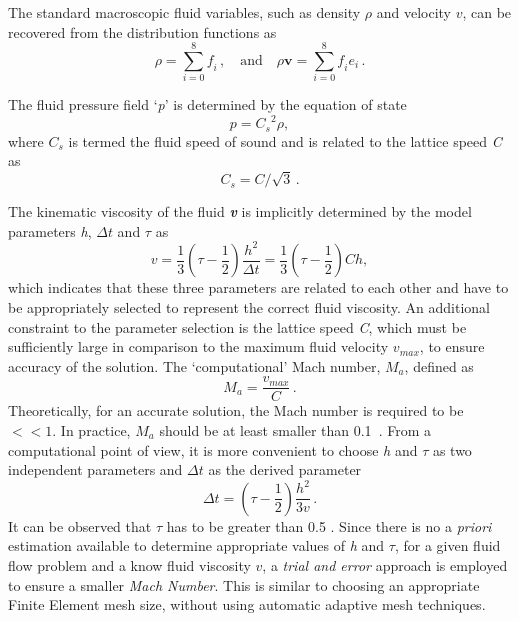 The standard macroscopic fluid variables, such as density $\rho$ and velocity 
$\mathbf{\mathit{ v}}$, can be recovered from the distribution functions as
%
\begin{equation}
	\rho = \sum\limits_{\mathit{i}=0}^{8}{\mathit{f_i}}\,, \quad \mbox{and} 
	\quad \rho \mathbf{v} 
	= \sum\limits_{\mathit{i}=0}^{8}{\mathit{f_i}}\mathbf{\mathit{e_i}}\,.
\end{equation}

The fluid pressure field `\textit{p}' is determined by the 
equation of state
%
\begin{equation}
	\mathit{p}=\mathit{C_s}^{2} \rho,
\end{equation}
%
\noindent where $\mathit{C_s}$ is termed the fluid speed of sound and is 
related to the lattice speed \textit{C} as
%
\begin{equation}
	\mathit{C_s}=\mathit{C}/\sqrt{3}\,.
\end{equation}

The kinematic viscosity of the fluid \textbf{\textit{v}} is implicitly 
determined by the model parameters \textit{h}, $\Delta \mathit{t}$ and $\tau$ 
as
%
\begin{equation}
	\mathit{v}=\frac{1}{3}(\tau - \frac{1}{2})\frac{\mathit{h}^{2}}{\Delta 
	\mathit{t}} = \frac{1}{3}(\tau - \frac{1}{2})\mathit{Ch},
\end{equation}
%
\noindent which indicates that these three parameters are related to each other 
and have to be appropriately selected to represent the correct fluid viscosity. 
An additional constraint to the parameter selection is the lattice speed 
\textit{C}, which must be sufficiently large in comparison to the maximum 
fluid velocity $\mathit{v}_{\mathit{max}}$, to ensure 
accuracy of the solution. The `computational' Mach number, 
$\mathit{M}_{\mathit{a}}$, defined as
%
\begin{equation}
	\mathit{M}_{\mathit{a}}=\frac{\mathit{v}_{\mathit{max}}}{\mathit{C}}\,.
\end{equation}
%
Theoretically, for an accurate solution, the Mach number is required to be $<< 
1$. In practice, $\mathit{M}_{\mathit{a}}$ should be at least smaller than 
0.1~\citep{He1997}. 
From a computational point of view, it is more convenient to choose \textit{h} 
and $\tau$ as two independent parameters and $\Delta \mathit{t}$ as the derived 
parameter
%
\begin{equation}
	\Delta \mathit{t} = (\tau - \frac{1}{2}) \frac{h^{2}}{3\mathit{v}}\,.
\end{equation}
%
It can be observed that $\tau$ has to be greater than 0.5 \citep{He1997}. 
Since there is no a \emph{priori} estimation available to determine appropriate 
values 
of \textit{h} and $\tau$, for a given fluid flow problem and a know fluid 
viscosity $\mathit{v}$, a \textit{trial and error} approach is employed to 
ensure a smaller \textit{Mach Number}. This is similar to choosing an 
appropriate Finite Element mesh size, without using automatic adaptive mesh 
techniques. 

